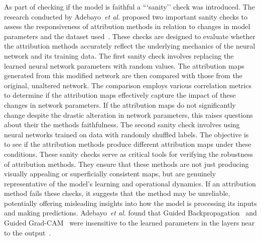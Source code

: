 As part of checking if the model is faithful a ```sanity'' check was introduced. The research conducted by Adebayo~\textit{et al.} proposed two important sanity checks to assess the responsiveness of attribution methods in relation to changes in model parameters and the dataset used~\cite{AdebayoGMGHK18}. These checks are designed to evaluate whether the attribution methods accurately reflect the underlying mechanics of the neural network and its training data. The first sanity check involves replacing the learned neural network parameters with random values. The attribution maps generated from this modified network are then compared with those from the original, unaltered network. The comparison employs various correlation metrics to determine if the attribution maps effectively capture the impact of these changes in network parameters. If the attribution maps do not significantly change despite the drastic alteration in network parameters, this raises questions about their the methods faithfulness. The second sanity check involves using neural networks trained on data with randomly shuffled labels. The objective is to see if the attribution methods produce different attribution maps under these conditions. These sanity checks serve as critical tools for verifying the robustness of attribution methods. They ensure that these methods are not just producing visually appealing or superficially consistent maps, but are genuinely representative of the model's learning and operational dynamics. If an attribution method fails these checks, it suggests that the method may be unreliable, potentially offering misleading insights into how the model is processing its inputs and making predictions. Adebayo~\textit{et al.} found that Guided Backpropagation~\cite{SpringenbergDBR14} and Guided Grad-CAM~\cite{SelvarajuCDVPB17} were insensitive to the learned parameters in the layers near to the output~\cite{AdebayoGMGHK18}. 


